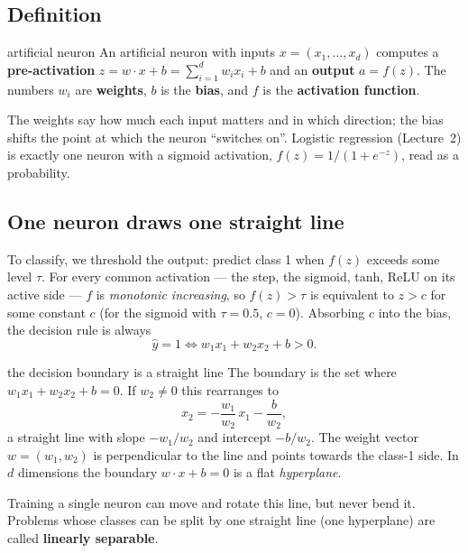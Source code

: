 \documentclass[11pt]{article}
\begin{document}
\subsection{Definition}
\begin{definition}{artificial neuron}
An artificial neuron with inputs $x=(x_1,\dots,x_d)$ computes a \textbf{pre-activation} $z=w\cdot x+b=\sum_{i=1}^dw_ix_i+b$ and an \textbf{output} $a=f(z)$. The numbers $w_i$ are \textbf{weights}, $b$ is the \textbf{bias}, and $f$ is the \textbf{activation function}.
\end{definition}
The weights say how much each input matters and in which direction; the bias shifts the point at which the neuron ``switches on''. Logistic regression (Lecture~2) is exactly one neuron with a sigmoid activation, $f(z)=1/(1+e^{-z})$, read as a probability.

\subsection{One neuron draws one straight line}
To classify, we threshold the output: predict class 1 when $f(z)$ exceeds some level $\tau$. For every common activation --- the step, the sigmoid, tanh, ReLU on its active side --- $f$ is \emph{monotonic increasing}, so $f(z)>\tau$ is equivalent to $z>c$ for some constant $c$ (for the sigmoid with $\tau=0.5$, $c=0$). Absorbing $c$ into the bias, the decision rule is always
\[\hat y=1\iff w_1x_1+w_2x_2+b>0.\]
\begin{derivation}{the decision boundary is a straight line}
The boundary is the set where $w_1x_1+w_2x_2+b=0$. If $w_2\neq0$ this rearranges to
\[x_2=-\frac{w_1}{w_2}\,x_1-\frac{b}{w_2},\]
a straight line with slope $-w_1/w_2$ and intercept $-b/w_2$. The weight vector $w=(w_1,w_2)$ is perpendicular to the line and points towards the class-1 side. In $d$ dimensions the boundary $w\cdot x+b=0$ is a flat \emph{hyperplane}.
\end{derivation}
Training a single neuron can move and rotate this line, but never bend it. Problems whose classes can be split by one straight line (one hyperplane) are called \textbf{linearly separable}.
\end{document}
